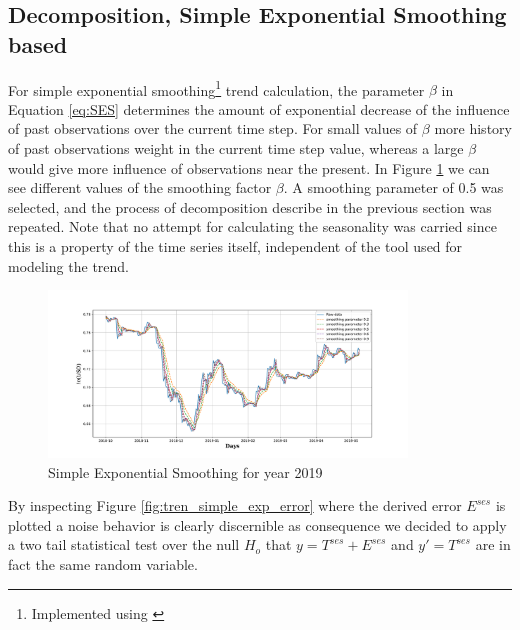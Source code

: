 \subsection{Decomposition, Simple Exponential Smoothing based}


For simple exponential smoothing\footnote{Implemented using \cite{Statsmodels}} trend calculation, the parameter $\beta$ in Equation \ref{eq:SES} determines the amount of exponential decrease of the influence of past observations over the current time step. For small values of $\beta$ more history of past observations weight in the current time step value, whereas a large $\beta$ would give more influence of observations near the present. In Figure \ref{fig:tren_simple_exp} we can see different values of the smoothing factor $\beta$. A smoothing parameter of 0.5 was selected, and the process of decomposition describe in the previous section was repeated. Note that no attempt for calculating the seasonality was carried since this is a property of the time series itself, independent of the tool used for modeling the trend.

\begin{figure}[htpb!] %
	\centering %
	\includegraphics[width=0.85\textwidth]{data/trend_SES.pdf} %
	\caption{Simple Exponential Smoothing for year 2019} %
	\label{fig:tren_simple_exp} %
\end{figure}

By inspecting Figure \ref{fig:tren_simple_exp_error} where the derived error $E^{ses}$ is plotted a noise behavior is clearly discernible as consequence we  decided to apply  a two tail statistical test over the null $H_{o}$ that $y=T^{ses}+E^{ses}$ and $y'=T^{ses}$ are in fact the same random variable.

